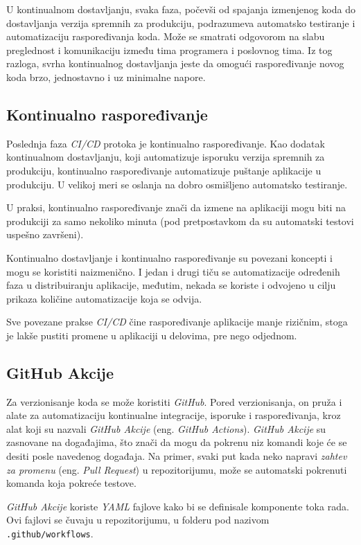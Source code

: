 U kontinualnom dostavljanju, svaka faza, počevši od spajanja izmenjenog koda do dostavljanja 
verzija spremnih za produkciju, podrazumeva automatsko testiranje i automatizaciju raspoređivanja 
koda. Može se smatrati odgovorom na slabu preglednost i komunikaciju između tima 
programera i poslovnog tima. Iz tog razloga, svrha kontinualnog dostavljanja jeste da omogući 
raspoređivanje novog koda brzo, jednostavno i uz minimalne napore.

\subsection{Kontinualno raspoređivanje}
Poslednja faza \textit{CI/CD} protoka je kontinualno raspoređivanje. Kao dodatak kontinualnom dostavljanju, 
koji automatizuje isporuku verzija spremnih za produkciju, kontinualno raspoređivanje automatizuje 
puštanje aplikacije u produkciju. U velikoj meri se oslanja na dobro osmišljeno automatsko testiranje.

U praksi, kontinualno raspoređivanje znači da izmene na aplikaciji mogu biti na produkciji za samo 
nekoliko minuta (pod pretpostavkom da su automatski testovi uspešno završeni).

Kontinualno dostavljanje i kontinualno raspoređivanje su povezani koncepti i mogu se koristiti naizmenično. 
I jedan i drugi tiču se automatizacije određenih faza u distribuiranju aplikacije, 
međutim, nekada se koriste i odvojeno u cilju prikaza količine automatizacije koja se odvija.

Sve povezane prakse \textit{CI/CD} čine raspoređivanje aplikacije manje rizičnim, stoga je lakše pustiti 
promene u aplikaciji u delovima, pre nego odjednom.~\cite{CI_CD}

\subsection{GitHub Akcije}
Za verzionisanje koda se može koristiti \textit{GitHub}. Pored verzionisanja, on pruža i alate za automatizaciju 
kontinualne integracije, isporuke i raspoređivanja, kroz alat koji su nazvali \textit{GitHub Akcije} 
(eng. \textit{GitHub Actions}). 
\textit{GitHub Akcije} su zasnovane na događajima, što znači da mogu da pokrenu niz komandi koje će se desiti 
posle navedenog događaja. Na primer, svaki put kada neko napravi \textit{zahtev za promenu} 
(eng. \textit{Pull Request}) u repozitorijumu, može se automatski pokrenuti komanda koja pokreće 
testove. 

\textit{GitHub Akcije} koriste \textit{YAML} fajlove kako bi se definisale komponente toka rada. Ovi fajlovi 
se čuvaju u repozitorijumu, u folderu pod nazivom \mbox{\texttt{.github/workflows}}.


